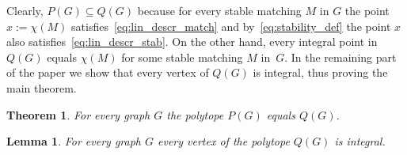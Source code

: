 \documentclass[preprint]{elsarticle}
\newtheorem{lemma}[fact]{Lemma}
\newtheorem{theorem}[fact]{Theorem}
\begin{document}
Clearly, $P(G)\subseteq Q(G)$ because for every stable matching $M$ in $G$ the point $x:=\chi(M)$  satisfies~\eqref{eq:lin_descr_match} and by~\eqref{eq:stability_def} the point $x$ also satisfies~\eqref{eq:lin_descr_stab}. On the other hand, every integral point in $Q(G)$ equals $\chi(M)$ for some stable matching $M$ in~$G$. In the remaining part of the paper we show that every vertex of $Q(G)$ is integral, thus proving the main theorem.

\begin{theorem}
	For every graph $G$ the polytope $P(G)$ equals $Q(G)$.
\end{theorem}


\begin{lemma}
	For every graph $G$ every vertex of the polytope $Q(G)$ is integral.
\end{lemma}
\end{document}
